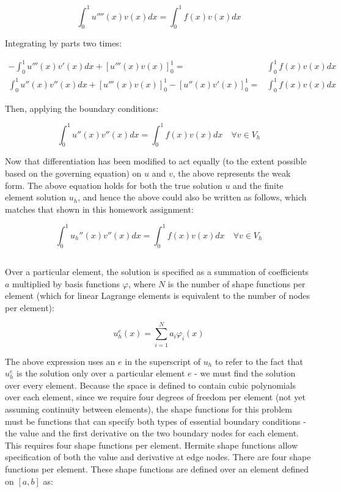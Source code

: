 \documentclass[10pt]{article}
\newcommand{\beq}{\begin{equation}}
\newcommand{\eeq}{\end{equation}}
\newcommand{\beqa}{\begin{equation}\begin{aligned}}
\newcommand{\eeqa}{\end{aligned}\end{equation}}
\begin{document}
\beq
\int_{0}^{1}u''''(x)v(x)dx=\int_{0}^{1}f(x)v(x)dx
\eeq

Integrating by parts two times:

\beqa
-\int_{0}^{1}u'''(x)v'(x)dx+\left\lbrack u'''(x)v(x)\right\rbrack_0^1=& \int_{0}^{1}f(x)v(x)dx\\
\int_{0}^{1}u''(x)v''(x)dx+\left\lbrack u'''(x)v(x)\right\rbrack_0^1-\left\lbrack u''(x)v'(x)\right\rbrack_0^1=& \int_{0}^{1}f(x)v(x)dx
\eeqa

Then, applying the boundary conditions:

\beq
\int_{0}^{1}u''(x)v''(x)dx=\int_{0}^{1}f(x)v(x)dx \quad\forall v\in V_h
\eeq

Now that differentiation has been modified to act equally (to the extent possible based on the governing equation) on \(u\) and \(v\), the above represents the weak form. The above equation holds for both the true solution \(u\) and the finite element solution \(u_h\), and hence the above could also be written as follows, which matches that shown in this homework assignment:

\beq
\int_{0}^{1}u_h''(x)v''(x)dx=\int_{0}^{1}f(x)v(x)dx \quad\forall v\in V_h
\eeq

\subsection{}

Over a particular element, the solution is specified as a summation of coefficients \(a\) multiplied by basis functions \(\varphi\), where \(N\) is the number of shape functions per element (which for linear Lagrange elements is equivalent to the number of nodes per element):

\beq
\label{eq:11}
u_h^e(x)=\sum_{i=1}^{N}a_i\varphi_i(x)
\eeq

The above expression uses an \(e\) in the superscript of \(u_h\) to refer to the fact that \(u_h^e\) is the solution only over a particular element \(e\) - we must find the solution over every element. Because the space is defined to contain cubic polynomials over each element, since we require four degrees of freedom per element (not yet assuming continuity between elements), the shape functions for this problem must be functions that can specify both types of essential boundary conditions - the value and the first derivative on the two boundary nodes for each element. This requires four shape functions per element. Hermite shape functions allow specification of both the value and derivative at edge nodes. There are four shape functions per element. These shape functions are defined over an element defined on \([a, b]\) as:
\end{document}
